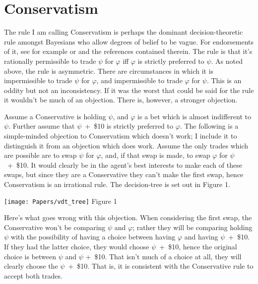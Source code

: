 \hypertarget{conservatism}{%
\section{Conservatism}\label{conservatism}}

The rule I am calling Conservatism is perhaps the dominant
decision-theoretic rule amongst Bayesians who allow degrees of belief to
be vague. For endorsements of it, see for example \citet{Williams1976} or
\citet{Seidenfeld1984} and the references contained therein. The rule is that
it's rationally permissible to trade $\psi$ for $\varphi$ iff $\varphi$ is strictly preferred
to $\psi$. As noted above, the rule is asymmetric. There are circumstances in
which it is impermissible to trade $\psi$ for $\varphi$, and impermissible to trade $\varphi$
for $\psi$. This is an oddity but not an inconsistency. If it was the worst
that could be said for the rule it wouldn't be much of an objection.
There is, however, a stronger objection.

Assume a Conservative is holding $\psi$, and $\varphi$ is a bet which is almost
indifferent to $\psi$. Further assume that $\psi$~+~\$10 is strictly preferred to
$\varphi$. The following is a simple-minded objection to Conservatism which
doesn't work; I include it to distinguish it from an objection which
does work. Assume the only trades which are possible are to swap $\psi$ for
$\varphi$, and, if that swap is made, to swap $\varphi$ for $\psi$~+~\$10. It would clearly
be in the agent's best interests to make each of these swaps, but since
they are a Conservative they can't make the first swap, hence
Conservatism is an irrational rule. The decision-tree is set out in
Figure 1.

\begin{center}
\texttt{[image: Papers/vdt\_tree]}
Figure 1
\end{center}

Here's what goes wrong with this objection. When considering the first
swap, the Conservative won't be comparing $\psi$ and $\varphi$; rather they will be
comparing holding $\psi$ with the possibility of having a choice between
having $\varphi$ and having $\psi$~+~\$10. If they had the latter choice, they would
choose $\psi$~+~\$10, hence the original choice is between $\psi$ and $\psi$ +~\$10.
That isn't much of a choice at all, they will clearly choose the
$\psi$~+~\$10. That is, it is consistent with the Conservative rule to accept
both trades.

